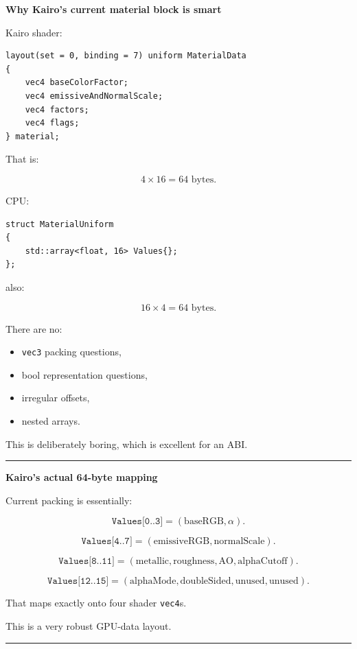 \textbf{Why Kairo's current material block is smart}

Kairo shader:

\begin{verbatim}
layout(set = 0, binding = 7) uniform MaterialData
{
    vec4 baseColorFactor;
    vec4 emissiveAndNormalScale;
    vec4 factors;
    vec4 flags;
} material;
\end{verbatim}

That is:

\[
4\times16=64\text{ bytes}.
\]

CPU:

\begin{verbatim}
struct MaterialUniform
{
    std::array<float, 16> Values{};
};
\end{verbatim}

also:

\[
16\times4=64\text{ bytes}.
\]

There are no:

\begin{itemize}
\tightlist
\item
  \texttt{vec3} packing questions,
\item
  bool representation questions,
\item
  irregular offsets,
\item
  nested arrays.
\end{itemize}

This is deliberately boring, which is excellent for an ABI.

\begin{center}\rule{0.5\linewidth}{0.5pt}\end{center}

\textbf{Kairo's actual 64-byte mapping}

Current packing is essentially:

\[
\texttt{Values[0..3]}
=
(\text{baseRGB},\alpha).
\]

\[
\texttt{Values[4..7]}
=
(\text{emissiveRGB},\text{normalScale}).
\]

\[
\texttt{Values[8..11]}
=
(\text{metallic},
\text{roughness},
\text{AO},
\text{alphaCutoff}).
\]

\[
\texttt{Values[12..15]}
=
(\text{alphaMode},
\text{doubleSided},
\text{unused},\text{unused}).
\]

That maps exactly onto four shader \texttt{vec4}s.

This is a very robust GPU-data layout.

\begin{center}\rule{0.5\linewidth}{0.5pt}\end{center}

